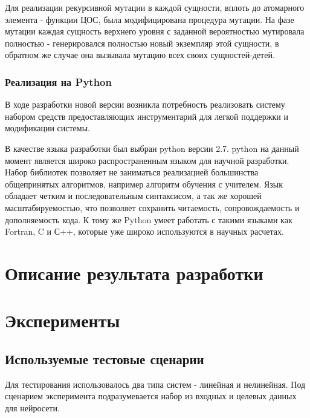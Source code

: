 \documentclass[utf8,usehyperref,12pt]{G7-32}
\begin{document}
Для реализации рекурсивной мутации в каждой сущности, вплоть до атомарного элемента - функции ЦОС, была модифицирована процедура мутации. На фазе мутации каждая сущность верхнего уровня с заданной вероятностью мутировала полностью - генерировался полностью новый экземпляр этой сущности, в обратном же случае она вызывала мутацию всех своих сущностей-детей.

\subsection{Реализация на Python}
В ходе разработки новой версии возникла потребность реализовать систему набором средств предоставляющих инструментарий для легкой поддержки и модификации системы.

В качестве языка разработки был выбран python версии 2.7. python на данный момент является широко распространенным языком для научной разработки. Набор библиотек позволяет не заниматься реализацией большинства общепринятых алгоритмов, например алгоритм обучения с учителем. Язык обладает четким и последовательным синтаксисом, а так же хорошей масштабируемостью, что позволяет сохранить читаемость, сопровождаемость и дополняемость кода. К тому же Python умеет работать с такими языками как Fortran, C и С++, которые уже широко используются в научных расчетах.

\chapter{Описание результата разработки}
\chapter{Эксперименты}
\section{Используемые тестовые сценарии}
Для тестирования использовалось два типа систем - линейная и нелинейная. Под сценарием эксперимента подразумевается набор из входных и целевых данных для нейросети.
\end{document}
